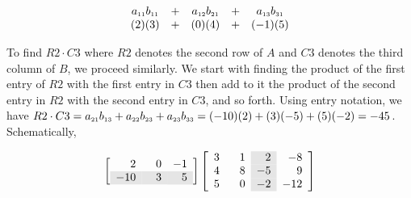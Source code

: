 \[\begin{array}{ccccc}
 a_{\mbox{\tiny$11$}}b_{\mbox{\tiny$11$}} & + & a_{\mbox{\tiny$12$}}b_{\mbox{\tiny$21$}} & + & a_{\mbox{\tiny$13$}}b_{\mbox{\tiny$31$}}  \\

  (2)(3) & + &(0)(4)& + & (-1)(5)  \\

\end{array}\]



To find $R2 \cdot C3$ where $R2$ denotes the second row of $A$ and $C3$ denotes the third column of $B$, we proceed similarly. We start with finding the product of the first entry of $R2$ with the first entry in $C3$ then add to it the product of the second entry in $R2$ with the second entry in $C3$, and so forth.  Using entry notation, we have $R2 \cdot C3 = a_{\mbox{\tiny$21$}}b_{\mbox{\tiny$13$}} + a_{\mbox{\tiny$22$}}b_{\mbox{\tiny$23$}} + a_{\mbox{\tiny$23$}}b_{\mbox{\tiny$33$}} = (-10)(2) + (3)(-5) + (5)(-2) = -45$.  Schematically, 

\[ \left[\begin{array}{rrr} 2 & 0 & -1 \\ \rowcolor[gray]{0.9} -10 & \hphantom{-}3 & 5 \\ \end{array} \right] \left[\begin{array}{rr>{\columncolor[gray]{0.9}}rr}  3 & \hphantom{-}1 & 2 & -8 \\ 4 & 8 & -5 & 9  \\ 5 & 0 & -2 & -12 \\  \end{array} \right] \]


